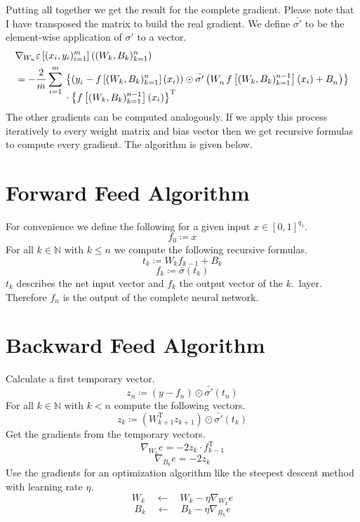 \documentclass[a4paper,fleqn]{article}
\begin{document}
    Putting all together we get the result for the complete gradient.
    Please note that I have transposed the matrix to build the real gradient.
    We define $\bar{\sigma'}$ to be the element-wise application of $\sigma'$ to a vector.
    \begin{align*}
      &\nabla_{W_n}\varepsilon\left[(x_i,y_i)_{i=1}^m\right]\left((W_k,B_k)_{k=1}^n\right) \\
      & = -\frac{2}{m} \sum_{i=1}^m
        \begin{aligned}[t]
          &\left\{ \left(y\indices{_i} - f\left[(W_k,B_k)_{k=1}^n\right](x_i)\right) \odot \bar{\sigma'}\left(W\indices{_n} f\left[(W_k,B_k)_{k=1}^{n-1}\right]\left(x_i\right) + B\indices{_n} \right) \right\} \\
          &\cdot \left\{ f\left[(W_k,B_k)_{k=1}^{n-1}\right]\left(x_i\right) \right\}^\mathrm{T}
        \end{aligned}
    \end{align*}
    The other gradients can be computed analogously.
    If we apply this process iteratively to every weight matrix and bias vector then we get recursive formulas to compute every gradient.
    The algorithm is given below.

  \section*{Forward Feed Algorithm}
    For convenience we define the following for a given input $x\in[0,1]^{q_1}$.
    \[
      f_0 \coloneqq x
    \]
    For all $k\in\mathds{N}$ with $k\leq n$ we compute the following recursive formulas.
    \[
      t_k \coloneqq W_k f_{k-1} + B_k
    \]
    \[
      f_k \coloneqq \bar{\sigma}(t_k)
    \]
    $t_k$ describes the net input vector and $f_k$ the output vector of the $k$.~layer.
    Therefore $f_n$ is the output of the complete neural network.

  \section*{Backward Feed Algorithm}
    Calculate a first temporary vector.
    \[
      z_n \coloneqq (y - f_n)\odot \bar{\sigma'}(t_n)
    \]
    For all $k\in\mathds{N}$ with $k<n$ compute the following vectors.
    \[
      z_k \coloneqq \left(W_{k+1}^\mathrm{T} z_{k+1}\right) \odot \bar{\sigma'}(t_k)
    \]
    Get the gradients from the temporary vectors.
    \[
      \nabla_{W_k}e = -2 z_k \cdot f^\mathrm{T}_{k-1}
    \]
    \[
      \nabla_{B_k}e = -2 z_k
    \]
    Use the gradients for an optimization algorithm like the steepest descent method with learning rate $\eta$.
    \[
      W_k \quad \longleftarrow \quad W_k - \eta\nabla_{W_k}e
    \]
    \[
      B_k \quad \longleftarrow \quad B_k - \eta\nabla_{B_k}e
    \]
\end{document}
